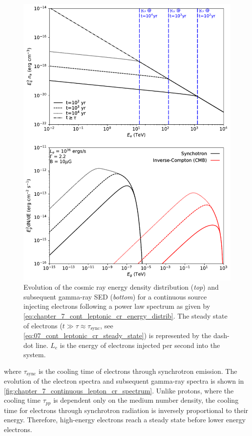 \begin{figure} [hbtp]
	\centering
	\includegraphics[width=1.0\textwidth]{07_Particle_Evolution/Images/evolution/continuous_electron_total_spectrum.pdf}
	\caption{Evolution of the cosmic ray energy density distribution (\textit{top}) and subsequent gamma-ray SED (\textit{bottom}) for a continuous source injecting electrons following a power law spectrum as given by \autoref{eq:chapter_7_cont_leptonic_cr_energy_distrib}. The steady state of electrons ($t\gg \tau\approx \tau_\text{sync}$, see \autoref{eq:07_cont_leptonic_cr_steady_state}) is represented by the dash-dot line. $L_e$ is the energy of electrons injected per second into the system.}
	\label{fig:chapter_7_continuous_lepton_cr_spectrum}
\end{figure}

\noindent where $\tau_\text{sync}$ is the cooling time of electrons through synchrotron emission. The evolution of the electron spectra and subsequent gamma-ray spectra is shown in \autoref{fig:chapter_7_continuous_lepton_cr_spectrum}. Unlike protons, where the cooling time $\tau_{pp}$ is dependent only on the medium number density, the cooling time for electrons through synchrotron radiation is inversely proportional to their energy. Therefore, high-energy electrons reach a steady state before lower energy electrons.

